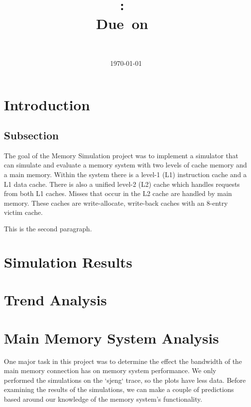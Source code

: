\documentclass{article}
\title{
\vspace{2in}
\textmd{\textbf{\hmwkClass:\ \hmwkTitle}}\\
\normalsize\vspace{0.1in}\small{Due\ on\ \hmwkDueDate}\\
\vspace{3in}
}
\author{
\textbf{\hmwkAuthorName} \\
\hmwkAuthorNumber
}
\date{\today} %
\begin{document}
\maketitle



\newpage


\section{Introduction}
\subsection{Subsection}
The goal of the Memory Simulation project was to implement a simulator that can simulate and evaluate a memory system with two levels of cache memory and a main memory. Within the system there is a level-1 (L1) instruction cache and a L1 data cache. There is also a unified level-2 (L2) cache which handles requests from both L1 caches. Misses that occur in the L2 cache are handled by main memory. These caches are write-allocate, write-back caches with an 8-entry victim cache. 

This is the second paragraph. 

\section{Simulation Results}

\section{Trend Analysis}

\section{Main Memory System Analysis}

One major task in this project was to determine the effect the bandwidth of the
main memory connection has on memory system performance. We only performed the
simulations on the `sjeng` trace, so the plots have less data. Before examining
the results of the simulations, we can make a couple of predictions based around
our knowledge of the memory system's functionality.
\end{document}
